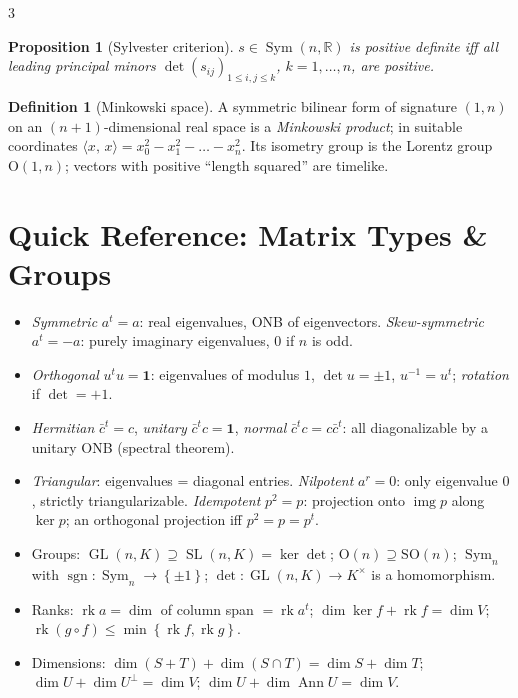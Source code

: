 \documentclass[10pt,a4paper,landscape]{article}
\theoremstyle{definition}
\newtheorem{defn}{Definition}[section]
\theoremstyle{plain}
\newtheorem{prop}{Proposition}[section]
\theoremstyle{remark}
\newcommand{\R}{\mathbb{R}}
\newcommand{\set}[1]{\left\{ #1 \right\}}
\newcommand{\comp}{\circ}
\DeclareMathOperator{\GL}{GL}
\DeclareMathOperator{\SLgrp}{SL}
\DeclareMathOperator{\Sym}{Sym}
\DeclareMathOperator{\rk}{rk}
\DeclareMathOperator{\img}{img}
\DeclareMathOperator{\Ann}{Ann}
\DeclareMathOperator{\sgn}{sgn}
\newcommand{\On}{\mathrm{O}}
\newcommand{\SOn}{\mathrm{SO}}
\newcommand{\ip}[2]{\langle #1,\, #2 \rangle}
\newcommand{\one}{\mathbf{1}}
\begin{document}
\begin{multicols*}{3}
\begin{prop}[Sylvester criterion]
$s \in \Sym(n,\R)$ is positive definite iff all \emph{leading principal minors} $\det(s_{ij})_{1 \le i,j \le k}$, $k = 1, \dots, n$, are positive.
\end{prop}

\begin{defn}[Minkowski space]
A symmetric bilinear form of signature $(1, n)$ on an $(n+1)$-dimensional real space is a \emph{Minkowski product}; in suitable coordinates $\ip{x}{x} = x_0^2 - x_1^2 - \dots - x_n^2$. Its isometry group is the Lorentz group $\On(1,n)$; vectors with positive ``length squared'' are timelike.
\end{defn}

\section{Quick Reference: Matrix Types \& Groups}

\begin{itemize}
\item \emph{Symmetric} $a^t = a$: real eigenvalues, ONB of eigenvectors. \emph{Skew-symmetric} $a^t = -a$: purely imaginary eigenvalues, $0$ if $n$ is odd.
\item \emph{Orthogonal} $u^t u = \one$: eigenvalues of modulus $1$, $\det u = \pm 1$, $u^{-1} = u^t$; \emph{rotation} if $\det = +1$.
\item \emph{Hermitian} $\bar c^t = c$, \emph{unitary} $\bar c^t c = \one$, \emph{normal} $\bar c^t c = c \bar c^t$: all diagonalizable by a unitary ONB (spectral theorem).
\item \emph{Triangular}: eigenvalues = diagonal entries. \emph{Nilpotent} $a^r = 0$: only eigenvalue $0$, strictly triangularizable. \emph{Idempotent} $p^2 = p$: projection onto $\img p$ along $\ker p$; an orthogonal projection iff $p^2 = p = p^t$.
\item Groups: $\GL(n,K) \supseteq \SLgrp(n,K) = \ker \det$; $\On(n) \supseteq \SOn(n)$; $\Sym_n$ with $\sgn: \Sym_n \to \set{\pm 1}$; $\det: \GL(n,K) \to K^{\times}$ is a homomorphism.
\item Ranks: $\rk a = \dim$ of column span $= \rk a^t$; $\dim \ker f + \rk f = \dim V$; $\rk(g \comp f) \le \min\set{\rk f, \rk g}$.
\item Dimensions: $\dim(S + T) + \dim(S \cap T) = \dim S + \dim T$; $\dim U + \dim U^{\bot} = \dim V$; $\dim U + \dim \Ann U = \dim V$.
\end{itemize}

\end{multicols*}
\end{document}
